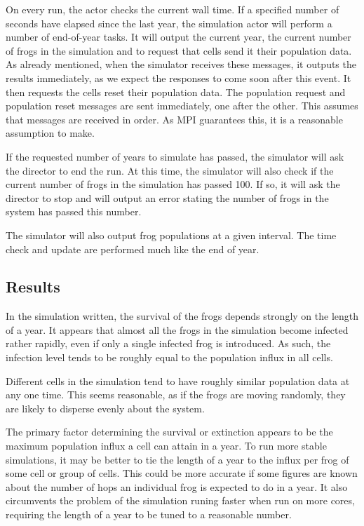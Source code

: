 \documentclass[12pt,a4paper]{article}
\begin{document}
On every run, the actor checks the current wall time.
If a specified number of seconds have elapsed since the last year,
the simulation actor will perform a number of end-of-year tasks.
It will output the current year, the current number of frogs in
the simulation and to request that cells send it their population
data.
As already mentioned, when the simulator receives these messages, it outputs
the results immediately, as we expect the responses to come soon after
this event.
It then requests the cells reset their population data.
The population request and population reset messages are sent
immediately, one after the other.
This assumes that messages are received in order.
As MPI guarantees this, it is a reasonable assumption to make.

If the requested number of years to simulate has passed,
the simulator will ask the director to end the run.
At this time, the simulator will also check if the current number of
frogs in the simulation has passed 100.
If so, it will ask the director to stop and will output an error
stating the number of frogs in the system has passed this number.

The simulator will also output frog populations at a given interval.
The time check and update are performed much like the end of year.


\subsection{Results}
In the simulation written, the survival of the frogs depends strongly
on the length of a year.
It appears that almost all the frogs in the simulation become infected
rather rapidly, even if only a single infected frog is introduced.
As such, the infection level tends to be roughly equal to the
population influx in all cells.

Different cells in the simulation tend to have roughly similar population
data at any one time.
This seems reasonable, as if the frogs are moving randomly, they are
likely to disperse evenly about the system.

The primary factor determining the survival or extinction appears to be
the maximum population influx a cell can attain in a year.
To run more stable simulations, it may be better to tie the length
of a year to the influx per frog of some cell or group of cells.
This could be more accurate if some figures are known about the number
of hops an individual frog is expected to do in a year.
It also circumvents the problem of the simulation runing faster
when run on more cores, requiring the length of a year to be tuned
to a reasonable number.
\end{document}
